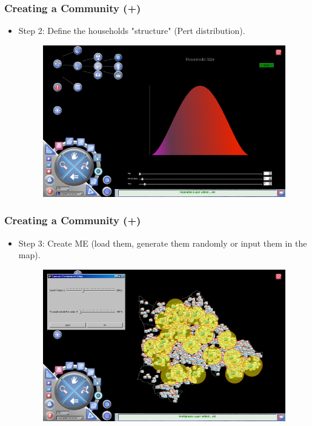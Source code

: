 \documentclass[hyperref={pdfpagelabels=true}]{beamer}
\begin{document}
\begin{frame}
\frametitle{Creating a Community (+)}
\begin{itemize}
\item Step 2: Define the households "structure" (Pert distribution).
\begin{figure}
\includegraphics[scale=0.4]{generate_households1.png}
\end{figure}
\end{itemize}
\end{frame}

\begin{frame}
\frametitle{Creating a Community (+)}
\begin{itemize}
\item Step 3: Create ME (load them, generate them randomly or input them in the map).
\begin{figure}
\includegraphics[scale=0.4]{generate_workplaces1.png}
\end{figure}
\end{itemize}
\end{frame}
\end{document}
